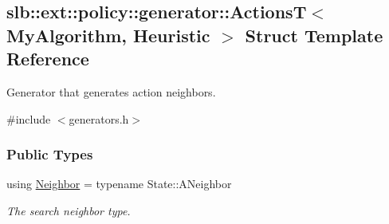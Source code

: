 \hypertarget{structslb_1_1ext_1_1policy_1_1generator_1_1ActionsT}{}\subsection{slb\+:\+:ext\+:\+:policy\+:\+:generator\+:\+:ActionsT$<$ My\+Algorithm, Heuristic $>$ Struct Template Reference}
\label{structslb_1_1ext_1_1policy_1_1generator_1_1ActionsT}


Generator that generates action neighbors.  




{\ttfamily \#include $<$generators.\+h$>$}

\subsubsection*{Public Types}
\begin{DoxyCompactItemize}
\item 
using \hyperlink{structslb_1_1ext_1_1policy_1_1generator_1_1ActionsT_a579c1e623b0e091ad02ab78edb271810}{Neighbor} = typename State\+::\+A\+Neighbor\hypertarget{structslb_1_1ext_1_1policy_1_1generator_1_1ActionsT_a579c1e623b0e091ad02ab78edb271810}{}\label{structslb_1_1ext_1_1policy_1_1generator_1_1ActionsT_a579c1e623b0e091ad02ab78edb271810}

\begin{DoxyCompactList}\small\item\em The search neighbor type. \end{DoxyCompactList}\end{DoxyCompactItemize}

